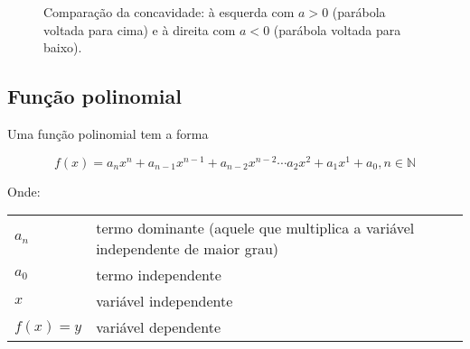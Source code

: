 \documentclass[12pt,openright,twoside,a4paper]{article}
\makeatletter
\theoremstyle{definition}
\newenvironment{condicoes}[1][Onde:]
{#1 \begin{tabular}[t]{>{$}l<{$} @{${} \implies {}$} l}}
	{\end{tabular}\\[\belowdisplayskip]}
\makeatother
\begin{document}
	\begin{figure}[h]
		\centering
		\begin{minipage}{0.48\textwidth}
			\centering
		\end{minipage}
		\hfill
		\begin{minipage}{0.48\textwidth}
			\centering
		\end{minipage}
		\caption{Comparação da concavidade: à esquerda com $a > 0$ (parábola voltada para cima) e à direita com $a < 0$ (parábola voltada para baixo).}
		\label{fig:concavidade-a}
	\end{figure}
	
	
	\pagebreak
	
	\subsection{Função polinomial}
	Uma função polinomial tem a forma
	
	\begin{equation}
		f(x) = a_nx^n + a_{n-1}x^{n-1} + a_{n-2}x^{n-2} \cdots a_2x^2 + a_1x^1 + a_0, n \in \mathbb{N} 
	\end{equation}
	
	\begin{condicoes}
		a_n & termo dominante (aquele que multiplica a variável independente de maior grau)\\
		a_0 & termo independente\\
		x & variável independente\\
		f(x)=y & variável dependente 
	\end{condicoes}
	
\end{document}
